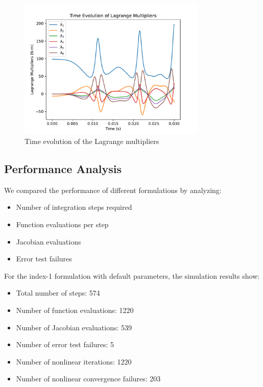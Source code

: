 \documentclass{article}
\begin{document}
\begin{figure}[H]
    \centering
    \includegraphics[width=0.8\textwidth]{plots/lagrange_multipliers.pdf}
    \caption{Time evolution of the Lagrange multipliers}
    \label{fig:lambdas}
\end{figure}

\FloatBarrier

\subsection{Performance Analysis}
\indent

We compared the performance of different formulations by analyzing:
\begin{itemize}
    \item Number of integration steps required
    \item Function evaluations per step
    \item Jacobian evaluations
    \item Error test failures
\end{itemize}

For the index-1 formulation with default parameters, the simulation results show:
\begin{itemize}
    \item Total number of steps: 574
    \item Number of function evaluations: 1220
    \item Number of Jacobian evaluations: 539
    \item Number of error test failures: 5
    \item Number of nonlinear iterations: 1220
    \item Number of nonlinear convergence failures: 203
\end{itemize}
\end{document}
